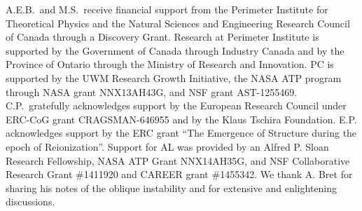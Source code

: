 \documentclass[usenatbib,iop,apj,numberedappendix]{aeb_emulateapj_2015}
\newcommand{\epm}{\ensuremath{e^+e^-}}
\begin{document}

\acknowledgements
A.E.B.~and M.S.~receive financial support from the Perimeter
Institute for Theoretical Physics and the Natural Sciences and
Engineering Research Council of Canada through a Discovery Grant.
Research at Perimeter Institute is supported by the Government of
Canada through Industry Canada and by the Province of Ontario through
the Ministry of Research and Innovation.
PC is supported by the UWM Research Growth Initiative, the NASA ATP
program through NASA grant NNX13AH43G, and NSF grant AST-1255469.
C.P.~gratefully acknowledges support by the European Research Council under ERC-CoG grant CRAGSMAN-646955 and by the Klaus Tschira Foundation.
E.P. acknowledges support by the ERC grant ``The Emergence of Structure during the epoch of Reionization''. Support for AL was provided by an Alfred P. Sloan Research Fellowship, NASA ATP Grant NNX14AH35G, and NSF Collaborative Research Grant \#1411920 and CAREER grant \#1455342.
We thank A. Bret for sharing his notes of the oblique instability and for extensive and enlightening discussions. 
\end{document}
